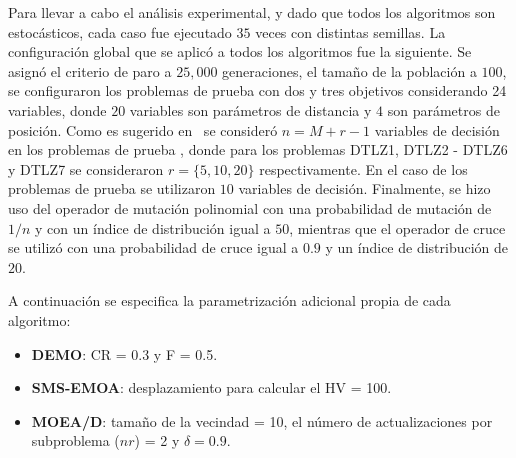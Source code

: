 Para llevar a cabo el análisis experimental, y dado que todos los algoritmos son estocásticos, cada caso fue ejecutado $35$ 
veces con distintas semillas.
%
La configuración global que se aplicó a todos los algoritmos fue la siguiente.
%
Se asignó el criterio de paro a $25,000$ generaciones, el tamaño de la población a $100$, 
se configuraron los problemas de prueba \WFG{} con dos y tres objetivos considerando 24 variables, 
donde $20$ variables son parámetros de distancia y $4$ son parámetros de posición.
%
Como es sugerido en~\cite{Joel:DTLZ_2} se consideró $n=M+r-1$ variables de decisión en los problemas de prueba \DTLZ{}, 
donde para los problemas DTLZ1, DTLZ2 - DTLZ6 y DTLZ7 se consideraron $r=\{5, 10, 20\}$  respectivamente.
% 
En el caso de los problemas de prueba \UF{} se utilizaron $10$ variables de decisión.
%
Finalmente, se hizo uso del operador de mutación polinomial con una probabilidad de mutación de $1/n$ y con un índice de distribución igual a $50$, 
mientras que el operador de cruce \SBX{} se utilizó con una probabilidad de cruce igual a $0.9$ y un índice de distribución de $20$.

A continuación se especifica la parametrización adicional propia de cada algoritmo:
\begin{itemize}
\item \textbf{DEMO}: CR = 0.3 y F = 0.5.
\item \textbf{SMS-EMOA}: desplazamiento para calcular el HV = 100.
\item \textbf{MOEA/D}: tamaño de la vecindad = 10, el número de actualizaciones por subproblema ($nr$) = 2 y $\delta = 0.9$.
\end{itemize}

